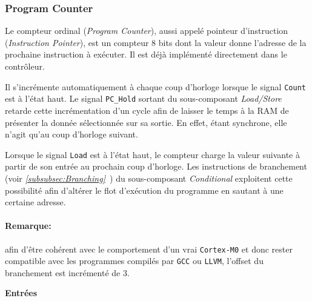 \documentclass{article}
\begin{document}
    \subsubsection{Program Counter}


    Le compteur ordinal (\textit{Program Counter}), aussi appelé pointeur d'instruction (\textit{Instruction Pointer}),
    est un compteur 8 bits dont la valeur donne l'adresse de la prochaine instruction à exécuter.
    Il est déjà implémenté directement dans le contrôleur.

    Il s'incrémente automatiquement à chaque coup d'horloge lorsque le signal \texttt{Count} est à l'état haut.
    Le signal \texttt{PC\_Hold} sortant du sous-composant \textit{Load/Store} retarde cette incrémentation d'un cycle afin de laisser le temps à la RAM de présenter la donnée sélectionnée sur sa sortie.
    En effet, étant synchrone, elle n'agit qu'au coup d'horloge suivant.

    Lorsque le signal \texttt{Load} est à l'état haut, le compteur charge la valeur suivante à partir de son entrée au prochain coup d'horloge.
    Les instructions de branchement (voir \textit{\ref{subsubsec:Branching}~}) du sous-composant \textit{Conditional} exploitent cette possibilité
    afin d'altérer le flot d'exécution du programme en sautant à une certaine adresse.

    \paragraph{Remarque:} afin d'être cohérent avec le comportement d'un vrai \texttt{Cortex-M0} et donc rester compatible avec les programmes compilés par \texttt{GCC} ou \texttt{LLVM},
    l'offset du branchement est incrémenté de 3.


    \textbf{Entrées}\\
\end{document}
